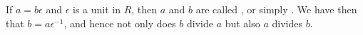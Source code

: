 If $a = b\epsilon$ and $\epsilon$ is a unit in $R$, then $a$ and $b$ are called , or simply . We have then that $b = a\epsilon^{-1}$, and hence not only does $b$ divide $a$ but also $a$ divides $b$.
